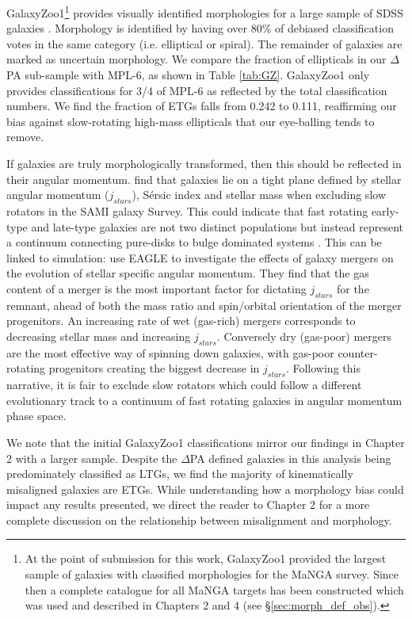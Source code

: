 GalaxyZoo1\footnote{At the point of submission for this work, GalaxyZoo1 provided the largest sample of galaxies with classified morphologies for the MaNGA survey. Since then a complete catalogue for all MaNGA targets has been constructed which was used and described in Chapters 2 and 4 (see \S\ref{sec:morph_def_obs}).} provides visually identified morphologies for a large sample of SDSS galaxies \citep{lintott2008}. Morphology is identified by having over 80\% of debiased classification votes in the same category (i.e. elliptical or spiral). The remainder of galaxies are marked as uncertain morphology. We compare the fraction of ellipticals in our $\Delta$PA sub-sample with MPL-6, as shown in Table \ref{tab:GZ}. GalaxyZoo1 only provides classifications for 3/4 of MPL-6 as reflected by the total classification numbers. We find the fraction of ETGs falls from 0.242 to 0.111, reaffirming our bias against slow-rotating high-mass ellipticals that our eye-balling tends to remove. 

If galaxies are truly morphologically transformed, then this should be reflected in their angular momentum. \citet{cortese2016} find that galaxies lie on a tight plane defined by stellar angular momentum ($j_{stars}$), S\'ersic index and stellar mass when excluding slow rotators in the SAMI galaxy Survey. This could indicate that fast rotating early-type and late-type galaxies are not two distinct populations but instead represent a continuum connecting pure-disks to bulge dominated systems \citep{cappellari2011}. This can be linked to simulation: \citet{lagos2017} use EAGLE \citep{EAGLE2015} to investigate the effects of galaxy mergers on the evolution of stellar specific angular momentum. They find that the gas content of a merger is the most important factor for dictating $j_{stars}$ for the remnant, ahead of both the mass ratio and spin/orbital orientation of the merger progenitors. An increasing rate of wet (gas-rich) mergers corresponds to decreasing stellar mass and increasing $j_{stars}$. Conversely dry (gas-poor) mergers are the most effective way of spinning down galaxies, with gas-poor counter-rotating progenitors creating the biggest decrease in $j_{stars}$. Following this narrative, it is fair to exclude slow rotators which could follow a different evolutionary track to a continuum of fast rotating galaxies in angular momentum phase space. 

We note that the initial GalaxyZoo1 classifications mirror our findings in Chapter 2 with a larger sample. Despite the $\Delta$PA defined galaxies in this analysis being predominately classified as LTGs, we find the majority of kinematically misaligned galaxies are ETGs. While understanding how a morphology bias could impact any results presented, we direct the reader to Chapter 2 for a more complete discussion on the relationship between misalignment and morphology.

